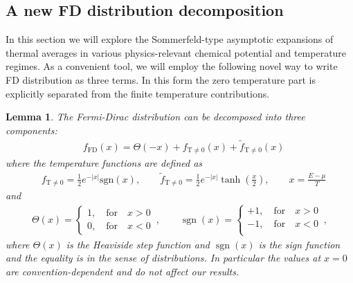 \documentclass[sn-mathphys,Numbered]{sn-jnl}
\DeclareMathOperator{\sgn}{sgn}
\newtheorem{lemma}[theorem]{Lemma}
\begin{document}
\subsection{A new FD distribution decomposition}\label{FDdecom}
In this section we will explore the Sommerfeld-type asymptotic expansions of thermal averages in various physics-relevant chemical potential and temperature regimes. As a convenient tool, we will employ the following novel way to write FD distribution as three terms. In this form the zero temperature part is explicitly separated from the finite temperature contributions. 
\begin{lemma}
 The Fermi-Dirac distribution can be decomposed into three components:
\begin{align}\label{Eq_form}
&f_\mathrm{FD}(x)=\Theta(-x)+f_\mathrm{T\neq0}(x)+\widetilde f_\mathrm{T\neq0}(x)
\end{align}
where the temperature functions are defined as
\begin{align}\label{eq:f_T_nonzero_def}
&f_\mathrm{T\neq0}=\frac{1}{2}e^{ -|x| }\mathrm{sgn}\left(x\right),\qquad
\widetilde f_\mathrm{T\neq0}=\frac{1}{2}e^{ - |x| }\tanh\left(\frac{x}{2}\right),\qquad x=\frac{E-\mu}{T}
\end{align}
and
\begin{align}
\label{NFF2}
\Theta(x)=\left\{
\begin{array}{r}
1,\quad\mathrm{for}\quad{x}>0\\
0,\quad\mathrm{for}\quad{x}<0
\end{array}\right.\,,\qquad
\sgn(x)=\left\{
\begin{array}{r}
+1,\quad\mathrm{for}\quad{x}>0\\
-1,\quad\mathrm{for}\quad{x}<0\\
\end{array}\right.\,,
\end{align}
where $\Theta(x)$ is the Heaviside step function and $\sgn(x)$ is the sign function and the equality is in the sense of distributions. In particular the values at $x=0$ are convention-dependent and do not affect our results. 
\end{lemma}
\end{document}
